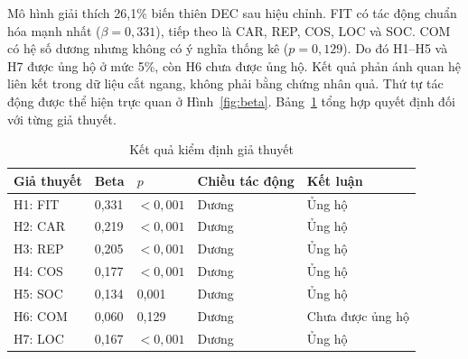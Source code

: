 Mô hình giải thích 26,1\% biến thiên DEC sau hiệu chỉnh. FIT có tác động chuẩn hóa mạnh nhất ($\beta=0,331$), tiếp theo là CAR, REP, COS, LOC và SOC. COM có hệ số dương nhưng không có ý nghĩa thống kê ($p=0,129$). Do đó H1--H5 và H7 được ủng hộ ở mức 5\%, còn H6 chưa được ủng hộ. Kết quả phản ánh quan hệ liên kết trong dữ liệu cắt ngang, không phải bằng chứng nhân quả.
Thứ tự tác động được thể hiện trực quan ở Hình~\ref{fig:beta}. Bảng~\ref{tab:hypotheses} tổng hợp quyết định đối với từng giả thuyết.
\figBeta
\begin{table}[H]\centering\caption{Kết quả kiểm định giả thuyết}\label{tab:hypotheses}
\begin{tabularx}{\textwidth}{p{1.4cm}p{2cm}p{2cm}p{2cm}X}\toprule Giả thuyết & Beta & $p$ & Chiều tác động & Kết luận\\\midrule
H1: FIT & 0,331 & $<0,001$ & Dương & Ủng hộ\\
H2: CAR & 0,219 & $<0,001$ & Dương & Ủng hộ\\
H3: REP & 0,205 & $<0,001$ & Dương & Ủng hộ\\
H4: COS & 0,177 & $<0,001$ & Dương & Ủng hộ\\
H5: SOC & 0,134 & 0,001 & Dương & Ủng hộ\\
H6: COM & 0,060 & 0,129 & Dương & Chưa được ủng hộ\\
H7: LOC & 0,167 & $<0,001$ & Dương & Ủng hộ\\\bottomrule
\end{tabularx}\end{table}

